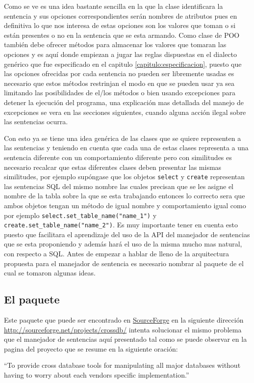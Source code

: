 Como se ve es una idea bastante sencilla en la que la clase identificara la sentencia y sus opciones correspondientes serán nombres de atributos pues en definitiva lo que nos interesa de estas opciones son los valores que toman o si están presentes o no en la sentencia que se esta armando. Como clase de POO también debe ofrecer métodos para almacenar los valores que tomaran las opciones y es aquí donde empiezan a jugar las reglas dispuestas en el dialecto genérico que fue especificado en el capitulo \ref{capitulo:especificacion}, puesto que las opciones ofrecidas por cada sentencia no pueden ser libremente usadas es necesario que estos métodos restrinjan el modo en que se pueden usar ya sea limitando las posibilidades de el/los métodos o bien usando excepciones para detener la ejecución del programa, una explicación mas detallada del manejo de excepciones se vera en las secciones siguientes, cuando alguna acción ilegal sobre las sentencias ocurra.

Con esto ya se tiene una idea genérica de las clases que se quiere representen a las sentencias y teniendo en cuenta que cada una de estas clases representa a una sentencia diferente con un comportamiento diferente pero con similitudes es necesario recalcar que estas diferentes clases deben presentar las mismas similitudes, por ejemplo supóngase que los objetos \verb|select| y \verb|create| representan las sentencias SQL del mismo nombre las cuales precisan que se les asigne el nombre de la tabla sobre la que se esta trabajando entonces lo correcto sera que ambos objetos tengan un método de igual nombre y comportamiento igual como por ejemplo \verb=select.set_table_name("name_1")= y \verb=create.set_table_name("name_2")=. Es muy importante tener en cuenta esto puesto que facilitara el aprendizaje del uso de la API del manejador de sentencias que se esta proponiendo y además hará el uso de la misma mucho mas natural, con respecto a SQL. Antes de empezar a hablar de lleno de la arquitectura propuesta para el manejador de sentencia es necesario nombrar al paquete \cc de el cual se tomaron algunas ideas.
%
\subsection{El paquete \cc}
Este paquete que puede ser encontrado en \href{http://sourceforge.net}{SourceForge} en la siguiente dirección \url{http://sourceforge.net/projects/crossdb/} intenta solucionar el mismo problema que el manejador de sentencias aquí presentado tal como se puede observar en la pagina del proyecto que se resume en la siguiente oración:
%
\begin{center}
``To provide cross database tools for manipulating all major databases without having to worry about each vendors specific implementation.''
\end{center} 

